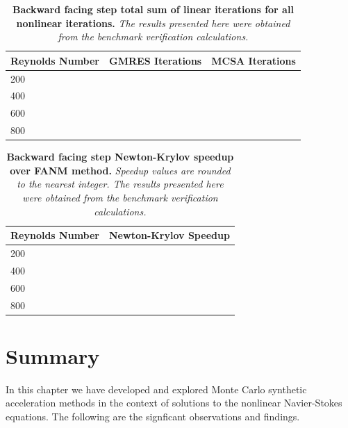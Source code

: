 \begin{table}[h!]
  \begin{center}
    \begin{tabular}{lcc}\hline\hline
      \multicolumn{1}{l}{Reynolds Number}& 
      \multicolumn{1}{c}{GMRES Iterations}&
      \multicolumn{1}{c}{MCSA Iterations}\\
      \hline
      200 & \\
      400 & \\
      600 & \\
      800 & \\
      \hline\hline
    \end{tabular}
  \end{center}
  \caption{\textbf{Backward facing step total sum of linear
      iterations for all nonlinear iterations.} \textit{The results
      presented here were obtained from the benchmark verification
      calculations.}}
  \label{tab:step_linear_iter_comparison}
\end{table}

\begin{table}[h!]
  \begin{center}
    \begin{tabular}{lc}\hline\hline
      \multicolumn{1}{l}{Reynolds Number}& 
      \multicolumn{1}{c}{Newton-Krylov Speedup}\\
      \hline
      200 & \\
      400 & \\
      600 & \\
      800 & \\
      \hline\hline
    \end{tabular}
  \end{center}
  \caption{\textbf{Backward facing step Newton-Krylov speedup
      over FANM method.} \textit{Speedup values are rounded to the
      nearest integer. The results presented here were obtained from
      the benchmark verification calculations.}}
  \label{tab:step_speedup_comparison}
\end{table}

\clearpage

\section{Summary}
\label{sec:nonlinear_summary}

In this chapter we have developed and explored Monte Carlo synthetic
acceleration methods in the context of solutions to the nonlinear
Navier-Stokes equations. The following are the signficant observations
and findings.

